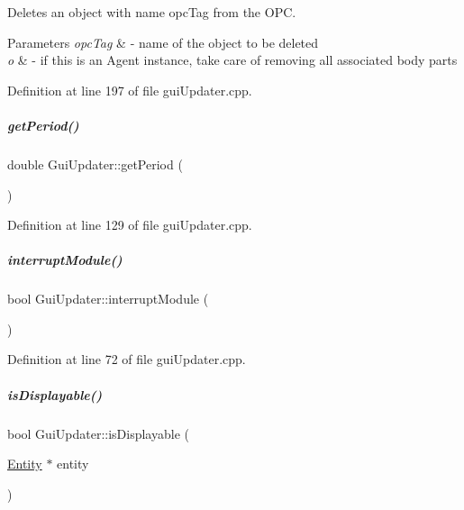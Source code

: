 Deletes an object with name {\ttfamily opc\+Tag} from the O\+PC. 


\begin{DoxyParams}{Parameters}
{\em opc\+Tag} & -\/ name of the object to be deleted \\
\hline
{\em o} & -\/ if this is an {\ttfamily Agent} instance, take care of removing all associated body parts \\
\hline
\end{DoxyParams}


Definition at line 197 of file gui\+Updater.\+cpp.

\mbox{\label{group__guiUpdater_a4d8e42af983197a7b97c80ca6e52fc49}} 
\subparagraph{\texorpdfstring{get\+Period()}{getPeriod()}}
{\footnotesize\ttfamily double Gui\+Updater\+::get\+Period (\begin{DoxyParamCaption}{ }\end{DoxyParamCaption})}



Definition at line 129 of file gui\+Updater.\+cpp.

\mbox{\label{group__guiUpdater_af6803c377f58e93185c0994af795cd32}} 
\subparagraph{\texorpdfstring{interrupt\+Module()}{interruptModule()}}
{\footnotesize\ttfamily bool Gui\+Updater\+::interrupt\+Module (\begin{DoxyParamCaption}{ }\end{DoxyParamCaption})}



Definition at line 72 of file gui\+Updater.\+cpp.

\mbox{\label{group__guiUpdater_abc5325875147de98ff7af75d0f3b8dd8}} 
\subparagraph{\texorpdfstring{is\+Displayable()}{isDisplayable()}}
{\footnotesize\ttfamily bool Gui\+Updater\+::is\+Displayable (\begin{DoxyParamCaption}\item[{\hyperlink{group__icubclient__representations_classicubclient_1_1Entity}{Entity} $\ast$}]{entity }\end{DoxyParamCaption})}



